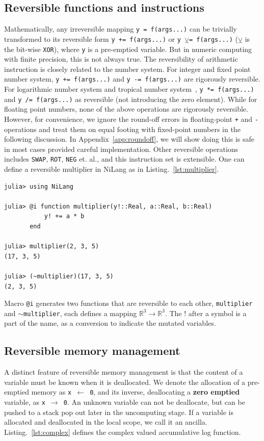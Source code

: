 \documentclass{article}
\let\oldsim\sim
\renewcommand{\sim}{{\oldsim}}
\newcommand{\<}{\langle}
\renewcommand{\>}{\rangle}
\renewcommand{\cite}[1]{{\citep{#1}}}
\newcommand{\Lst}[1]{Listing.~\ref{#1}}
\newcommand{\App}[1]{Appendix~\ref{#1}}
\theoremstyle{definition}\newtheorem{definition}{\textit{Definition}}
\begin{document}
\subsection{Reversible functions and instructions}
    Mathematically, any irreversible mapping \texttt{y = f(args...)} can be trivially transformed to its reversible form \texttt{y += f(args...)} or \texttt{y $\veebar$= f(args...)} ($\veebar$ is the bit-wise \texttt{XOR}), where \texttt{y} is a pre-emptied variable. But in numeric computing with finite precision, this is not always true. The reversibility of arithmetic instruction is closely related to the number system.
    For integer and fixed point number system, \texttt{y += f(args...)} and \texttt{y -= f(args...)} are rigorously reversible. For logarithmic number system and tropical number system~\cite{Speyer2009}, \texttt{y *= f(args...)} and \texttt{y /= f(args...)} as reversible (not introducing the zero element). While for floating point numbers, none of the above operations are rigorously reversible.
    However, for convenience, we ignore the round-off errors in floating-point \texttt{+} and \texttt{-} operations and treat them on equal footing with fixed-point numbers in the following discussion. In \App{app:roundoff}, we will show doing this is safe in most cases provided careful implementation.
Other reversible operations includes \texttt{SWAP}, \texttt{ROT}, \texttt{NEG} et. al., and this instruction set is extensible.
One can define a reversible multiplier in NiLang as in \Lst{lst:multiplier}.

\begin{minipage}{.88\columnwidth}
\begin{lstlisting}[mathescape=true,caption={A reversible multiplier},label={lst:multiplier}]
julia> using NiLang

julia> @i function multiplier(y!::Real, a::Real, b::Real)
           y! += a * b
       end

julia> multiplier(2, 3, 5)
(17, 3, 5)

julia> (~multiplier)(17, 3, 5)
(2, 3, 5)
\end{lstlisting}
\end{minipage}

Macro \texttt{@i} generates two functions that are reversible to each other, \texttt{multiplier} and \texttt{$\sim$multiplier}, each defines a mapping $\mathbb{R}^3 \rightarrow \mathbb{R}^3$. The $!$ after a symbol is a part of the name, as a conversion to indicate the mutated variables.

\subsection{Reversible memory management}
A distinct feature of reversible memory management is that the content of a variable must be known when it is deallocated.
We denote the allocation of a pre-emptied memory as \texttt{x $\leftarrow$ 0}, and its inverse, deallocating a \textbf{zero emptied} variable, as \texttt{x $\rightarrow$ 0}.
An unknown variable can not be deallocate, but can be pushed to a stack pop out later in the uncomputing stage.
If a variable is allocated and deallocated in the local scope, we call it an ancilla.
\Lst{lst:complex} defines the complex valued accumulative log function.
\end{document}
